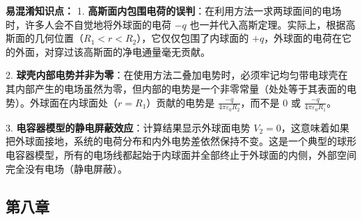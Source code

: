 \begin{enumerate}
	\textbf{易混淆知识点： }
	1. \textbf{高斯面内包围电荷的误判}：在利用方法一求两球面间的电场时，许多人会不自觉地将外球面的电荷 $-q$ 也一并代入高斯定理。实际上，根据高斯面的几何位置（$R_1 < r < R_2$），它仅仅包围了内球面的 $+q$，外球面的电荷在它的外面，对穿过该高斯面的净电通量毫无贡献。
	
	2. \textbf{球壳内部电势并非为零}：在使用方法二叠加电势时，必须牢记均匀带电球壳在其内部产生的电场虽然为零，但内部的电势是一个非零常量（处处等于其表面的电势）。外球面在内球面处（$r=R_1$）贡献的电势是 $\frac{-q}{4\pi\varepsilon_0 R_2}$，而不是 $0$ 或 $\frac{-q}{4\pi\varepsilon_0 R_1}$。
	
	3. \textbf{电容器模型的静电屏蔽效应}：计算结果显示外球面电势 $V_2 = 0$，这意味着如果把外球面接地，系统的电荷分布和内外电势差依然保持不变。这是一个典型的球形电容器模型，所有的电场线都起始于内球面并全部终止于外球面的内侧，外部空间完全没有电场（静电屏蔽）。
	
\end{enumerate}

\newpage

\subsection{第八章}

